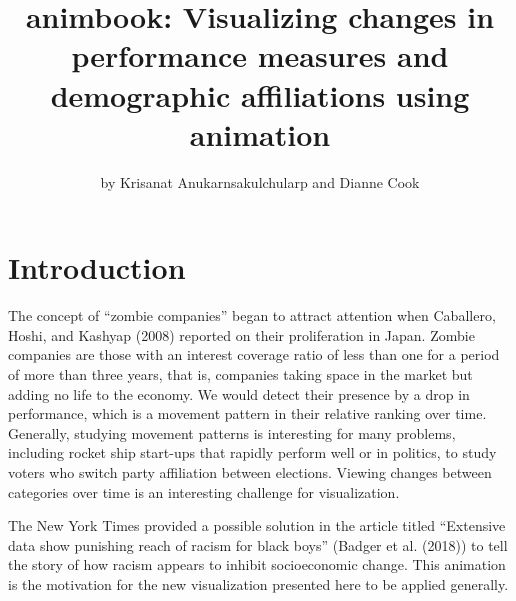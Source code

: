 \title{animbook: Visualizing changes in performance measures and demographic affiliations using animation}
\author{by Krisanat Anukarnsakulchularp and Dianne Cook}

\maketitle


\hypertarget{intro}{%
\section{Introduction}\label{intro}}

The concept of ``zombie companies'' began to attract attention when Caballero, Hoshi, and Kashyap (2008) reported on their proliferation in Japan. Zombie companies are those with an interest coverage ratio of less than one for a period of more than three years, that is, companies taking space in the market but adding no life to the economy. We would detect their presence by a drop in performance, which is a movement pattern in their relative ranking over time. Generally, studying movement patterns is interesting for many problems, including rocket ship start-ups that rapidly perform well or in politics, to study voters who switch party affiliation between elections. Viewing changes between categories over time is an interesting challenge for visualization.

The New York Times provided a possible solution in the article titled ``Extensive data show punishing reach of racism for black boys'' (Badger et al. (2018)) to tell the story of how racism appears to inhibit socioeconomic change. This animation is the motivation for the new visualization presented here to be applied generally.

